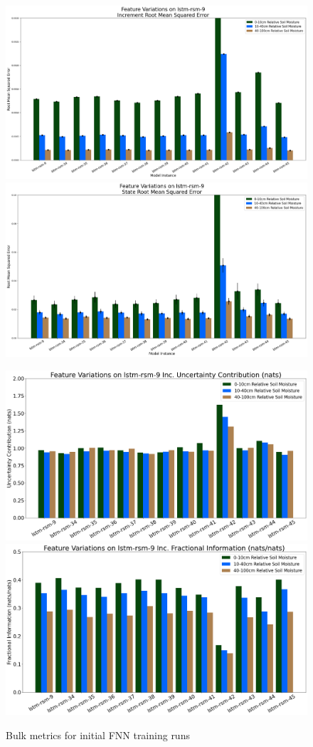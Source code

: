 \begin{figure}[hp!]
    \includegraphics[width=.48\linewidth,draft=false]{figures/efficiency_variations/eval_test_efficiency_variations-feat-lstm-rsm-9_mse_res.png}
    \includegraphics[width=.48\linewidth,draft=false]{figures/efficiency_variations/eval_test_efficiency_variations-feat-lstm-rsm-9_mse_state.png}

    \includegraphics[width=.48\linewidth,draft=false]{figures/efficiency_variations/eval_test_efficiency_variations-feat-lstm-rsm-9_info-loss_res.png}
    \includegraphics[width=.48\linewidth,draft=false]{figures/efficiency_variations/eval_test_efficiency_variations-feat-lstm-rsm-9_fi_res.png}

    \caption{Bulk metrics for initial FNN training runs}
    \label{model-init-fnn}
\end{figure}

